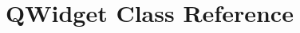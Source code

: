 \hypertarget{classPlayer_1_1QWidget}{}\section{Q\+Widget Class Reference}
\label{classPlayer_1_1QWidget}
